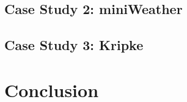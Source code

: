 \documentclass[sigconf, table]{acmart}
\begin{document}
\subsection{Case Study 2: miniWeather}

\subsection{Case Study 3: Kripke}


\section{Conclusion}
\end{document}
